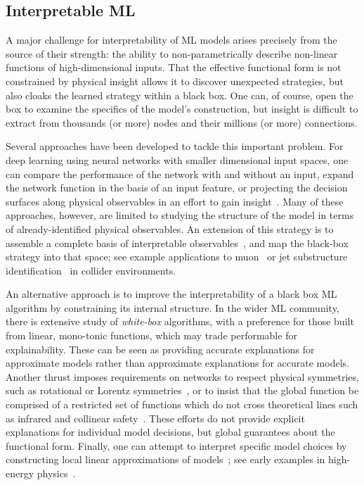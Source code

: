 \documentclass[submission,Phys]{SciPost}
\begin{document}
\subsection{Interpretable ML}

A major challenge for interpretability of ML models arises precisely from the source of their strength: the ability to non-parametrically describe non-linear functions of high-dimensional inputs. That the effective functional form is not constrained by physical insight allows it to discover unexpected strategies, but also cloaks the learned strategy within a black box.  One can, of course, open the box to examine the specifics of the model's construction, but insight is difficult to extract from thousands (or more) nodes and their millions (or more) connections.

Several approaches have been developed to tackle this important problem.  For deep learning using neural networks with smaller dimensional input spaces, one can compare the performance of the network with and without an input, expand the network function in the basis of an input feature, or  projecting the decision surfaces along physical observables in an effort to gain insight~\cite{Roxlo:2018adx,Chang:2017kvc, 2016arXiv161200410A,Wunsch:2018oxb,Baldi:2014kfa}. Many of these approaches, however, are limited to studying the structure of the model in terms of already-identified physical observables. An extension of this strategy is to assemble a complete basis of interpretable observables~\cite{Komiske:2017aww}, and map the black-box strategy into that space\cite{Faucett:2020vbu}; see example applications to muon~\cite{Collado:2020fwm} or jet substructure identification~\cite{Lu:2022cxg} in collider environments.

An alternative approach is to improve the interpretability of a black box ML algorithm by constraining its internal structure. In the wider ML community, there is extensive study of {\it white-box} algorithms, with a preference for those built from linear, mono-tonic functions, which may trade performable for explainability. These can be seen as providing accurate explanations for approximate models rather than approximate explanations for accurate models.  Another thrust imposes requirements on networks to respect physical symmetries, such as rotational or Lorentz symmetries~\cite{Butter:2022rso,Bogatskiy:2020tje,Bogatskiy:2022hub}, or to insist that the global function be comprised of a restricted set of functions which do not cross theoretical lines such as infrared and collinear safety~\cite{Komiske:2018cqr}. These efforts do not provide explicit explanations for individual model decisions, but global guarantees about the functional form.   Finally, one can attempt to interpret specific model choices by constructing local linear approximations of models~\cite{lime,https://doi.org/10.48550/arxiv.2206.06632}; see early examples in high-energy physics~\cite{Lai:2020byl,Agarwal:2020fpt}.
\end{document}
